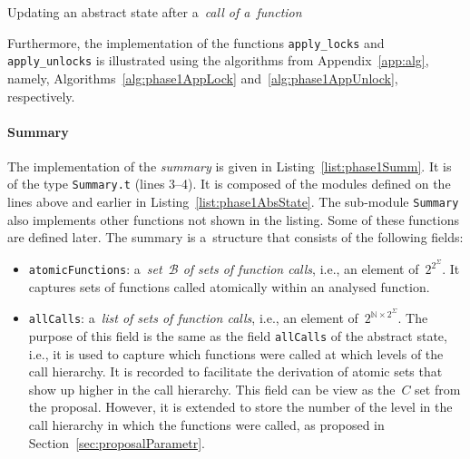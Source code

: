 \begin{algorithm}[hbt]
%
%
    \caption{Updating an abstract state after a~\emph{call of a~function}}
    \label{alg:phase1ApplCall}
\end{algorithm}

Furthermore, the implementation of the functions \texttt{apply\_locks} and \texttt{apply\_unlocks} is illustrated using the algorithms from Appendix~\ref{app:alg}, namely, Algorithms~\ref{alg:phase1AppLock} and~\ref{alg:phase1AppUnlock}, respectively.

\paragraph{Summary}
The implementation of the \emph{summary} is given in Listing~\ref{list:phase1Summ}. It is of the type \texttt{Summary.t} (lines 3--4). It is composed of the modules defined on the lines above and earlier in Listing~\ref{list:phase1AbsState}. The sub-module \texttt{Summary} also implements other functions not shown in the listing. Some of these functions are defined later. The summary is a~structure that consists of the following fields:
\begin{itemize}
    \item \texttt{atomicFunctions}: a~\emph{set~$ \mathcal{B} $ of sets of function calls}, i.e., an element of~$ 2^{2^\Sigma} $. It captures sets of functions called atomically within an analysed function.

    \item \texttt{allCalls}: a~\emph{list of sets of function calls}, i.e., an element of~$ 2^{\mathbb{N} \times 2^\Sigma} $. The purpose of this field is the same as the field \texttt{allCalls} of the abstract state, i.e., it is used to capture which functions were called at which levels of the call hierarchy. It is recorded to facilitate the derivation of atomic sets that show up higher in the call hierarchy. This field can be view as the~$ C $ set from the proposal. However, it is extended to store the number of the level in the call hierarchy in which the functions were called, as proposed in Section~\ref{sec:proposalParametr}.
\end{itemize}

